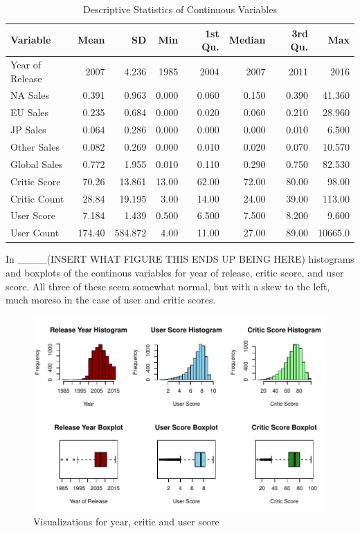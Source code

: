 \documentclass[12pt]{article}
\begin{document}
\begin{table}[ht]
  \caption{Descriptive Statistics of Continuous Variables}
\label{tab:ds}
\centering
\begin{tabular}{lrrrrrrr}
    \hline
  Variable & Mean & SD & Min & 1st Qu. & Median & 3rd Qu. & Max \\ 
    \hline
    Year of Release & 2007 & 4.236 & 1985 & 2004 & 2007 & 2011 & 2016\\ 
    NA Sales & 0.391 & 0.963 & 0.000 & 0.060 & 0.150 & 0.390 & 41.360\\ 
    EU Sales & 0.235 & 0.684 & 0.000 & 0.020 & 0.060 & 0.210 & 28.960\\ 
    JP Sales & 0.064 & 0.286 & 0.000 & 0.000 & 0.000 & 0.010 & 6.500\\ 
    Other Sales & 0.082 & 0.269 & 0.000 & 0.010 & 0.020 & 0.070 & 10.570\\ 
    Global Sales & 0.772 & 1.955 & 0.010 & 0.110 & 0.290 & 0.750 & 82.530\\ 
    Critic Score & 70.26 & 13.861 & 13.00 & 62.00 & 72.00 & 80.00 & 98.00\\
    Critic Count & 28.84 & 19.195 & 3.00 & 14.00 & 24.00 & 39.00 & 113.00\\
    User Score & 7.184 & 1.439 & 0.500 & 6.500 & 7.500 & 8.200 & 9.600\\ 
    User Count & 174.40 & 584.872 & 4.00 & 11.00 & 27.00 & 89.00 & 10665.0\\
     \hline
  \end{tabular}
  \end{table}

In ____(INSERT WHAT FIGURE THIS ENDS UP BEING HERE) histograms and boxplots of the continous variables for year of release, critic score, and user score.
All three of these seem somewhat normal, but with a skew to the left, much moreso in the case of user and critic scores.
\begin{figure}[tbp]
  \centering
  \includegraphics[width=\textwidth]{histandboxpt1.pdf}
  \caption{Visualizations for year, critic and user score}
  \label{fig:histandboxpt1}
\end{figure}
\end{document}
